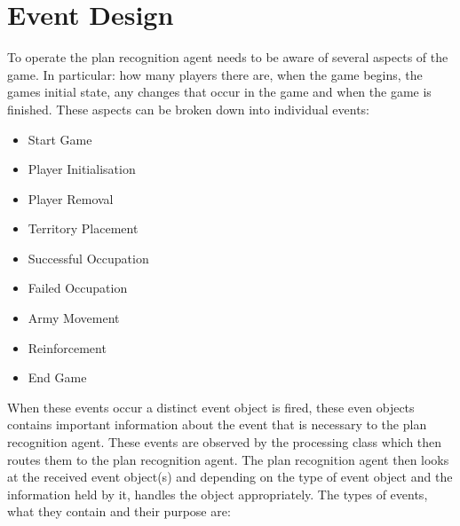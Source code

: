\documentclass[parskip]{cs4rep}
\begin{document}
\newpage

\section{Event Design}

To operate the plan recognition agent needs to be aware of several aspects of the game. In particular: how many players there are, when the game begins, the games initial state, any changes that occur in the game and when the game is finished. These aspects can be broken down into individual events:

\begin{itemize}
\item
Start Game
\item
Player Initialisation
\item
Player Removal
\item
Territory Placement
\item
Successful Occupation
\item
Failed Occupation
\item
Army Movement
\item
Reinforcement
\item
End Game
\end{itemize}

When these events occur a distinct event object is fired, these even objects contains important information about the event that is necessary to the plan recognition agent. These events are observed by the processing class which then routes them to the plan recognition agent. The plan recognition agent then looks at the received event object(s) and depending on the type of event object and the information held by it, handles the object appropriately. The types of events, what they contain and their purpose are:
\end{document}
